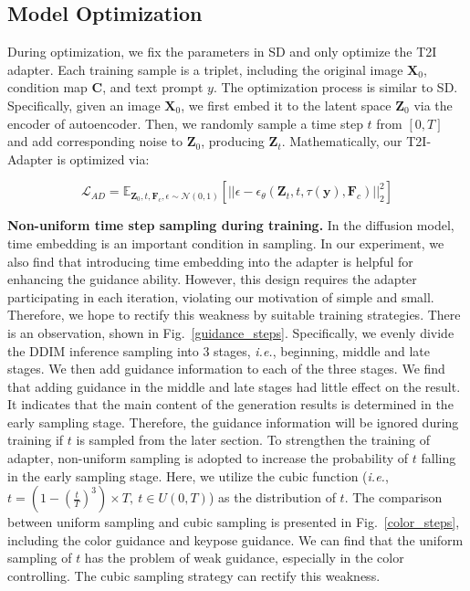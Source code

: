 \subsection{Model Optimization} During optimization, we fix the parameters in SD and only optimize the T2I adapter. Each training sample is a triplet, including the original image $\mathbf{X}_0$, condition map $\mathbf{C}$, and text prompt $y$. The optimization process is similar to SD. Specifically, given an image $\mathbf{X}_0$, we first embed it to the latent space $\mathbf{Z}_0$ via the encoder of autoencoder. Then, we randomly sample a time step $t$ from $[0, T]$ and add corresponding noise to $\mathbf{Z}_0$, producing $\mathbf{Z}_t$. Mathematically, our T2I-Adapter is optimized via:

\begin{equation}
    \mathcal{L}_{AD} = \mathbb{E}_{\mathbf{Z}_{0},t, \textbf{F}_c, \epsilon \sim \mathcal{N}(0,1)}\left[ ||\epsilon-\epsilon_{\theta}(\mathbf{Z}_{t},t,\tau(\mathbf{y}),\textbf{F}_c)||_2^2\right]
\end{equation}

 \textbf{Non-uniform time step sampling during training.} In the diffusion model, time embedding is an important condition in sampling. In our experiment, we also find that introducing time embedding into the adapter is helpful for enhancing the guidance ability. However, this design requires the adapter participating in each iteration, violating our motivation of simple and small. Therefore, we hope to rectify this weakness by suitable training strategies. There is an observation, shown in Fig.~\ref{guidance_steps}. Specifically, we evenly divide the DDIM inference sampling into 3 stages, \textit{i.e.}, beginning, middle and late stages. We then add guidance information to each of the three stages. We find that adding guidance in the middle and late stages had little effect on the result. It indicates that the main content of the generation results is determined in the early sampling stage. Therefore, the guidance information will be ignored during training if $t$ is sampled from the later section. To strengthen the training of adapter, non-uniform sampling is adopted to increase the probability of $t$ falling in the early sampling stage. Here, we utilize the cubic function (\textit{i.e.}, $t=(1-(\frac{t}{T})^3)\times T,\ t\in U(0,T)$) as the distribution of $t$. The comparison between uniform sampling and cubic sampling is presented in Fig.~\ref{color_steps}, including the color guidance and keypose guidance. We can find that the uniform sampling of $t$ has the problem of weak guidance, especially in the color controlling. The cubic sampling strategy can rectify this weakness.

